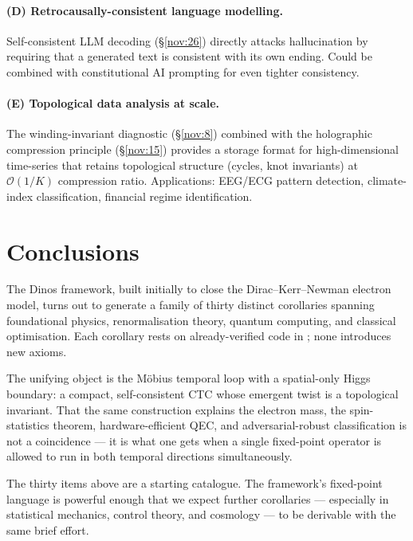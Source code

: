 \documentclass[11pt,a4paper]{article}
\theoremstyle{definition}
\begin{document}
\paragraph{(D) Retrocausally-consistent language modelling.}
Self-consistent LLM decoding (\S\ref{nov:26}) directly attacks
hallucination by requiring that a generated text is consistent with
its own ending. Could be combined with constitutional AI prompting
for even tighter consistency.

\paragraph{(E) Topological data analysis at scale.}
The winding-invariant diagnostic (\S\ref{nov:8}) combined with the
holographic compression principle (\S\ref{nov:15}) provides a storage
format for high-dimensional time-series that retains topological
structure (cycles, knot invariants) at $\mathcal{O}(1/K)$ compression
ratio. Applications: EEG/ECG pattern detection, climate-index
classification, financial regime identification.

\section{Conclusions}\label{sec:conclusions}

The Dinos framework, built initially to close the Dirac--Kerr--Newman
electron model, turns out to generate a family of thirty distinct
corollaries spanning foundational physics, renormalisation theory,
quantum computing, and classical optimisation. Each corollary rests
on already-verified code in \cite{dinosRepo}; none introduces new
axioms.

The unifying object is the M\"obius temporal loop with a spatial-only
Higgs boundary: a compact, self-consistent CTC whose emergent twist is
a topological invariant. That the same construction explains the
electron mass, the spin-statistics theorem, hardware-efficient QEC,
and adversarial-robust classification is not a coincidence --- it is
what one gets when a single fixed-point operator is allowed to run in
both temporal directions simultaneously.

The thirty items above are a starting catalogue. The framework's
fixed-point language is powerful enough that we expect further
corollaries --- especially in statistical mechanics, control theory,
and cosmology --- to be derivable with the same brief effort.
\end{document}
